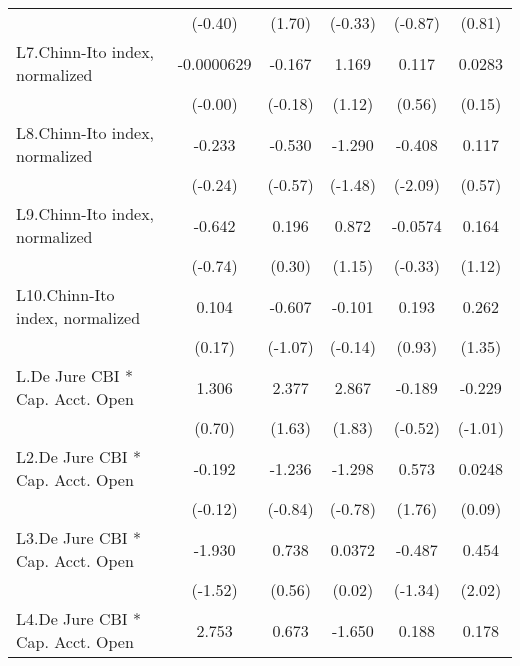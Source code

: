 {\begin{longtable}{l*{5}{c}}
                &  (-0.40)         &   (1.70)         &  (-0.33)         &  (-0.87)         &   (0.81)         \\
[1em]
L7.Chinn-Ito index, normalized&-0.0000629         &   -0.167         &    1.169         &    0.117         &   0.0283         \\
                &  (-0.00)         &  (-0.18)         &   (1.12)         &   (0.56)         &   (0.15)         \\
[1em]
L8.Chinn-Ito index, normalized&   -0.233         &   -0.530         &   -1.290         &   -0.408\sym{*}  &    0.117         \\
                &  (-0.24)         &  (-0.57)         &  (-1.48)         &  (-2.09)         &   (0.57)         \\
[1em]
L9.Chinn-Ito index, normalized&   -0.642         &    0.196         &    0.872         &  -0.0574         &    0.164         \\
                &  (-0.74)         &   (0.30)         &   (1.15)         &  (-0.33)         &   (1.12)         \\
[1em]
L10.Chinn-Ito index, normalized&    0.104         &   -0.607         &   -0.101         &    0.193         &    0.262         \\
                &   (0.17)         &  (-1.07)         &  (-0.14)         &   (0.93)         &   (1.35)         \\
[1em]
L.De Jure CBI * Cap. Acct. Open&    1.306         &    2.377         &    2.867         &   -0.189         &   -0.229         \\
                &   (0.70)         &   (1.63)         &   (1.83)         &  (-0.52)         &  (-1.01)         \\
[1em]
L2.De Jure CBI * Cap. Acct. Open&   -0.192         &   -1.236         &   -1.298         &    0.573         &   0.0248         \\
                &  (-0.12)         &  (-0.84)         &  (-0.78)         &   (1.76)         &   (0.09)         \\
[1em]
L3.De Jure CBI * Cap. Acct. Open&   -1.930         &    0.738         &   0.0372         &   -0.487         &    0.454\sym{*}  \\
                &  (-1.52)         &   (0.56)         &   (0.02)         &  (-1.34)         &   (2.02)         \\
[1em]
L4.De Jure CBI * Cap. Acct. Open&    2.753         &    0.673         &   -1.650         &    0.188         &    0.178         \\

\end{longtable}}
